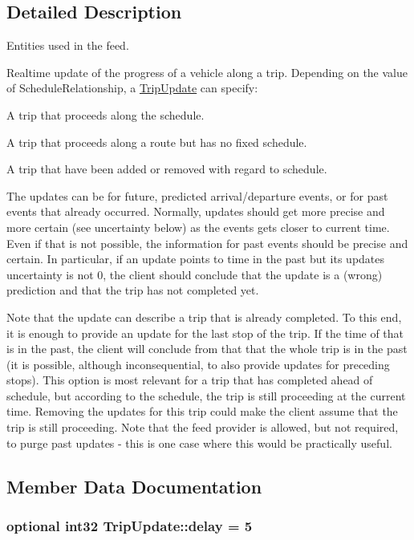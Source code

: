 \subsection{Detailed Description}
Entities used in the feed. 

Realtime update of the progress of a vehicle along a trip. Depending on the value of Schedule\+Relationship, a \hyperlink{structTripUpdate}{Trip\+Update} can specify\+:
\begin{DoxyItemize}
\item A trip that proceeds along the schedule.
\item A trip that proceeds along a route but has no fixed schedule.
\item A trip that have been added or removed with regard to schedule.
\end{DoxyItemize}

The updates can be for future, predicted arrival/departure events, or for past events that already occurred. Normally, updates should get more precise and more certain (see uncertainty below) as the events gets closer to current time. Even if that is not possible, the information for past events should be precise and certain. In particular, if an update points to time in the past but its update\textquotesingle{}s uncertainty is not 0, the client should conclude that the update is a (wrong) prediction and that the trip has not completed yet.

Note that the update can describe a trip that is already completed. To this end, it is enough to provide an update for the last stop of the trip. If the time of that is in the past, the client will conclude from that that the whole trip is in the past (it is possible, although inconsequential, to also provide updates for preceding stops). This option is most relevant for a trip that has completed ahead of schedule, but according to the schedule, the trip is still proceeding at the current time. Removing the updates for this trip could make the client assume that the trip is still proceeding. Note that the feed provider is allowed, but not required, to purge past updates -\/ this is one case where this would be practically useful. 

\subsection{Member Data Documentation}
\subsubsection[{\texorpdfstring{delay}{delay}}]{\setlength{\rightskip}{0pt plus 5cm}optional int32 Trip\+Update\+::delay = 5}\hypertarget{structTripUpdate_ad989dc481a35f7cdbf0bd640a33b67b6}{}\label{structTripUpdate_ad989dc481a35f7cdbf0bd640a33b67b6}


